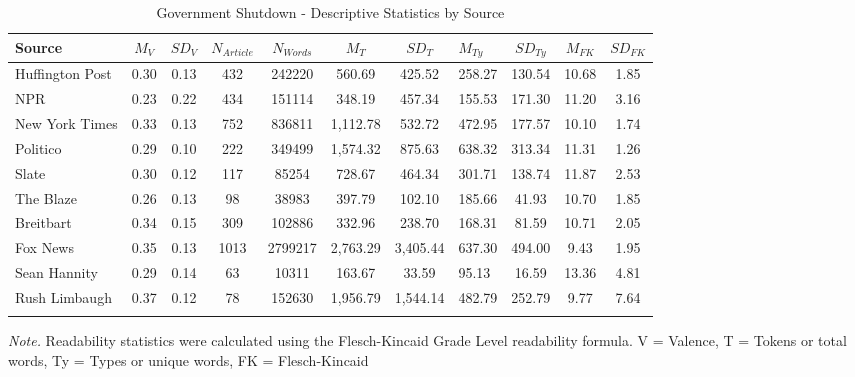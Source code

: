 \documentclass[
  english,
  man]{apa6}
\begin{document}
\begin{table}[pt]

\begin{center}
\begin{threeparttable}

\caption{\label{tab:exp2-source-descriptives-gs}Government Shutdown - Descriptive Statistics by Source}

\small{

\begin{tabular}{lcccccclccc}
\toprule
Source & $M_V$ & $SD_V$ & $N_{Article}$ & $N_{Words}$ & $M_T$ & $SD_T$ & $M_{Ty}$ & $SD_{Ty}$ & $M_{FK}$ & $SD_{FK}$\\
\midrule
Huffington Post & 0.30 & 0.13 & 432 & 242220 & 560.69 & 425.52 & 258.27 & 130.54 & 10.68 & 1.85\\
NPR & 0.23 & 0.22 & 434 & 151114 & 348.19 & 457.34 & 155.53 & 171.30 & 11.20 & 3.16\\
New York Times & 0.33 & 0.13 & 752 & 836811 & 1,112.78 & 532.72 & 472.95 & 177.57 & 10.10 & 1.74\\
Politico & 0.29 & 0.10 & 222 & 349499 & 1,574.32 & 875.63 & 638.32 & 313.34 & 11.31 & 1.26\\
Slate & 0.30 & 0.12 & 117 & 85254 & 728.67 & 464.34 & 301.71 & 138.74 & 11.87 & 2.53\\
The Blaze & 0.26 & 0.13 & 98 & 38983 & 397.79 & 102.10 & 185.66 & 41.93 & 10.70 & 1.85\\
Breitbart & 0.34 & 0.15 & 309 & 102886 & 332.96 & 238.70 & 168.31 & 81.59 & 10.71 & 2.05\\
Fox News & 0.35 & 0.13 & 1013 & 2799217 & 2,763.29 & 3,405.44 & 637.30 & 494.00 & 9.43 & 1.95\\
Sean Hannity & 0.29 & 0.14 & 63 & 10311 & 163.67 & 33.59 & 95.13 & 16.59 & 13.36 & 4.81\\
Rush Limbaugh & 0.37 & 0.12 & 78 & 152630 & 1,956.79 & 1,544.14 & 482.79 & 252.79 & 9.77 & 7.64\\
\bottomrule
\addlinespace
\end{tabular}

}

\begin{tablenotes}[para]
\normalsize{\textit{Note.} Readability statistics were calculated using the Flesch-Kincaid Grade Level readability formula. V = Valence, T = Tokens or total words, Ty = Types or unique words, FK = Flesch-Kincaid}
\end{tablenotes}

\end{threeparttable}
\end{center}

\end{table}
\end{document}
